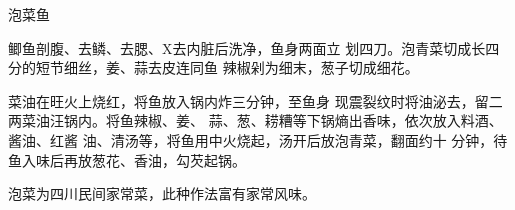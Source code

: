 \begin{recipe}{泡菜鱼}

\ingredients


\cooking

\step 鲫鱼剖腹、去鳞、去腮、X去内脏后洗净，鱼身两面立 划四刀。泡青菜切成长四分的短节细丝，姜、蒜去皮连同鱼 辣椒剁为细末，葱子切成细花。

菜油在旺火上烧红，将鱼放入锅内炸三分钟，至鱼身 现震裂纹时将油泌去，留二两菜油汪锅内。将鱼辣椒、姜、 蒜、葱、耢糟等下锅熵出香味，依次放入料酒、酱油、红酱 油、清汤等，将鱼用中火烧起，汤开后放泡青菜，翻面约十 分钟，待鱼入味后再放葱花、香油，勾芡起锅。

\notes

泡菜为四川民间家常菜，此种作法富有家常风味。

\end{recipe}

